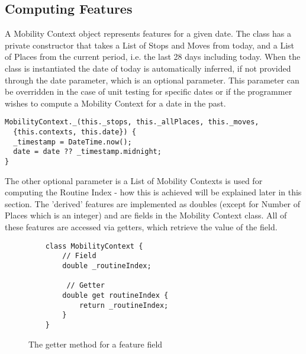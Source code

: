 \subsection{Computing Features}
A Mobility Context object represents features for a given date. The class has a private constructor that takes a List of Stops and Moves from today, and a List of Places from the current period, i.e. the last 28 days including today. When the class is instantiated the date of today is automatically inferred, if not provided through the date parameter, which is an optional parameter. This parameter can be overridden in the case of unit testing for specific dates or if the programmer wishes to compute a Mobility Context for a date in the past.

\begin{verbatim}
MobilityContext._(this._stops, this._allPlaces, this._moves,
  {this.contexts, this.date}) {
  _timestamp = DateTime.now();
  date = date ?? _timestamp.midnight;
}
\end{verbatim}

The other optional parameter is a List of Mobility Contexts is used for computing the Routine Index - how this is achieved will be explained later in this section. The 'derived' features are implemented as doubles (except for Number of Places which is an integer) and are fields in the Mobility Context class. All of these features are accessed via getters, which retrieve the value of the field.

\begin{figure}
    \centering
    \begin{verbatim}
    class MobilityContext {
        // Field
        double _routineIndex;
     
         // Getter
        double get routineIndex {
            return _routineIndex;
        }
    }
    \end{verbatim}
    \caption{The getter method for a feature field}
    \label{fig:feature-getter}
\end{figure}

